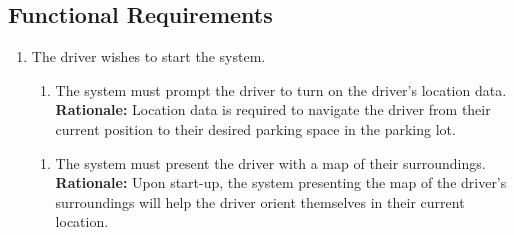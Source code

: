 \documentclass[12pt,letterpaper]{article}
\newcounter{businesseventnum}
\newcounter{funcreqnum}
\begin{document}
\subsection{Functional Requirements}
\begin{enumerate}[{BE}\thebusinesseventnum.] 
\item The driver wishes to start the system.
\begin{enumerate}[{FR}\thefuncreqnum.] 
    \item The system must prompt the driver to turn on the driver's location data.\\
    \textbf{Rationale:} Location data is required to navigate the driver from their current position to their desired parking space in the parking lot.
\end{enumerate}
\begin{enumerate}[{FR}\thefuncreqnum.] 
    \item The system must present the driver with a map of their surroundings.\\
    \textbf{Rationale:} Upon start-up, the system presenting the map of the driver's surroundings will help the driver orient themselves in their current location.
\end{enumerate}
\end{enumerate}
\end{document}
